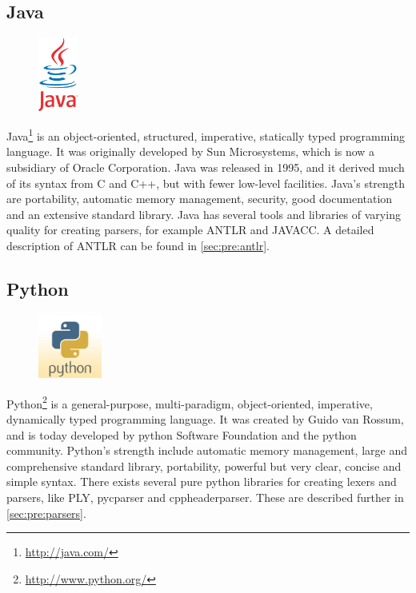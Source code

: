 \subsection{Java}
\begin{figure}
	\begin{center}
	\vspace{-30pt}
		\includegraphics[width=1.3cm]{./planning/img/java_logo}
	\vspace{-30pt}
	\end{center}
\end{figure}
Java\footnote{\url{http://java.com/}} is an object-oriented, structured,
imperative, statically typed programming language. It was originally developed
by Sun Microsystems, which is now a subsidiary of Oracle Corporation. Java was
released in 1995, and it derived much of its syntax from C and C++, but with
fewer low-level facilities. Java’s strength are portability, automatic memory
management, security, good documentation and an extensive standard library.
Java has several tools and libraries of varying quality for creating parsers,
for example ANTLR and JAVACC. A detailed description of ANTLR can be found in 
\autoref{sec:pre:antlr}.

\subsection{Python}
\begin{figure}
	\begin{center}
	\vspace{-30pt}
		\includegraphics[width=2.1cm]{./planning/img/python_logo}
	\vspace{-30pt}
	\end{center}
\end{figure}
Python\footnote{\url{http://www.python.org/}} is a general-purpose,
multi-paradigm, object-oriented, imperative, dynamically typed programming
language. It was created by Guido van Rossum, and is today developed by python
Software Foundation and the python community. Python’s strength include
automatic memory management, large and comprehensive standard library,
portability, powerful but very clear, concise and simple syntax. There exists
several pure python libraries for creating lexers and parsers, like PLY,
pycparser and cppheaderparser. These are described further in
\autoref{sec:pre:parsers}.


